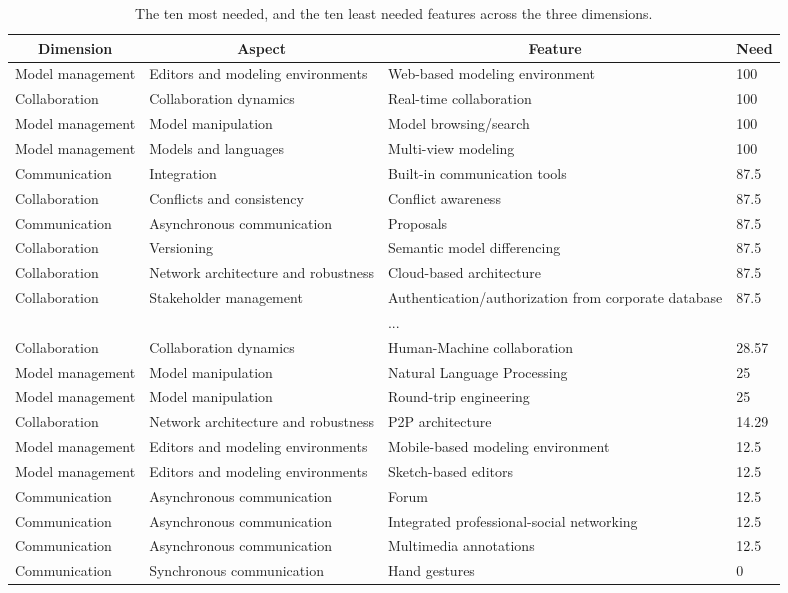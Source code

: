 
  \begin{table*}[]
  \centering
  \notsotiny
  \caption{ The ten most needed, and the ten least needed features across the three dimensions.}
\label{tab:top-bottom-need}
\begin{tabular}{@{}llll@{}}
  \toprule
\multicolumn{1}{c}{\textbf{Dimension}} & \multicolumn{1}{c}{\textbf{Aspect}} & \multicolumn{1}{c}{\textbf{Feature}} & \multicolumn{1}{c}{\textbf{Need}} \\ 

  \midrule
  Model management & Editors and modeling environments & Web-based modeling environment & 100 \\ 
Collaboration & Collaboration dynamics & Real-time collaboration & 100 \\ 
Model management & Model manipulation & Model browsing/search & 100 \\ 
Model management & Models and languages & Multi-view modeling & 100 \\ 
Communication & Integration & Built-in communication tools & 87.5 \\ 
Collaboration & Conflicts and consistency & Conflict awareness & 87.5 \\ 
Communication & Asynchronous communication & Proposals & 87.5 \\ 
Collaboration & Versioning & Semantic model differencing & 87.5 \\ 
Collaboration & Network architecture and robustness & Cloud-based architecture & 87.5 \\ 
Collaboration & Stakeholder management & Authentication/authorization from corporate database & 87.5 \\ 
\multicolumn{4}{c}{...} \\ 
Collaboration & Collaboration dynamics & Human-Machine collaboration & 28.57 \\ 
Model management & Model manipulation & Natural Language Processing & 25 \\ 
Model management & Model manipulation & Round-trip engineering & 25 \\ 
Collaboration & Network architecture and robustness & P2P architecture & 14.29 \\ 
Model management & Editors and modeling environments & Mobile-based modeling environment & 12.5 \\ 
Model management & Editors and modeling environments & Sketch-based editors & 12.5 \\ 
Communication & Asynchronous communication & Forum & 12.5 \\ 
Communication & Asynchronous communication & Integrated professional-social networking & 12.5 \\ 
Communication & Asynchronous communication & Multimedia annotations & 12.5 \\ 
Communication & Synchronous communication & Hand gestures & 0 \\ 
\bottomrule
  \end{tabular}%
  \end{table*}